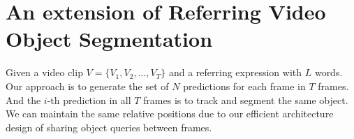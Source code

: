 \section{An extension of Referring Video Object Segmentation}
\label{sec:rvos_inference}
Given a video clip $V = \{V_1, V_2, ..., V_T\}$ and a referring expression with $L$ words. Our approach is to generate the set of $N$ predictions for each frame in $T$ frames. And the $i$-th prediction in all $T$ frames is to track and segment the same object. We can maintain the same relative positions due to our efficient architecture design of sharing object queries between frames.







